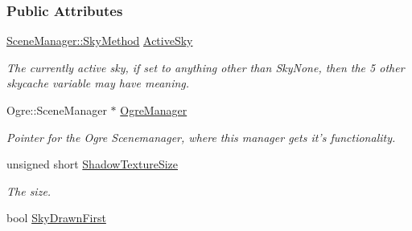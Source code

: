 \subsubsection*{Public Attributes}
\begin{DoxyCompactItemize}
\item 
\hypertarget{classMezzanine_1_1internal_1_1SceneManagerData_a13e182742dbeba04d7c5d13406b6a43f}{
\hyperlink{classMezzanine_1_1SceneManager_a80fac0c0b67191cb5450bddde74b470e}{SceneManager::SkyMethod} \hyperlink{classMezzanine_1_1internal_1_1SceneManagerData_a13e182742dbeba04d7c5d13406b6a43f}{ActiveSky}}
\label{classMezzanine_1_1internal_1_1SceneManagerData_a13e182742dbeba04d7c5d13406b6a43f}

\begin{DoxyCompactList}\small\item\em The currently active sky, if set to anything other than SkyNone, then the 5 other skycache variable may have meaning. \item\end{DoxyCompactList}\item 
\hypertarget{classMezzanine_1_1internal_1_1SceneManagerData_a04e6f2272890339328e3dac5faee0f41}{
Ogre::SceneManager $\ast$ \hyperlink{classMezzanine_1_1internal_1_1SceneManagerData_a04e6f2272890339328e3dac5faee0f41}{OgreManager}}
\label{classMezzanine_1_1internal_1_1SceneManagerData_a04e6f2272890339328e3dac5faee0f41}

\begin{DoxyCompactList}\small\item\em Pointer for the Ogre Scenemanager, where this manager gets it's functionality. \item\end{DoxyCompactList}\item 
\hypertarget{classMezzanine_1_1internal_1_1SceneManagerData_ab4681b7cab84917a96bafb857870632e}{
unsigned short \hyperlink{classMezzanine_1_1internal_1_1SceneManagerData_ab4681b7cab84917a96bafb857870632e}{ShadowTextureSize}}
\label{classMezzanine_1_1internal_1_1SceneManagerData_ab4681b7cab84917a96bafb857870632e}

\begin{DoxyCompactList}\small\item\em The size. \item\end{DoxyCompactList}\item 
\hypertarget{classMezzanine_1_1internal_1_1SceneManagerData_adb50e162f7edf7dfc708cb3bf2d511bf}{
bool \hyperlink{classMezzanine_1_1internal_1_1SceneManagerData_adb50e162f7edf7dfc708cb3bf2d511bf}{SkyDrawnFirst}}
\label{classMezzanine_1_1internal_1_1SceneManagerData_adb50e162f7edf7dfc708cb3bf2d511bf}


\end{DoxyCompactItemize}
